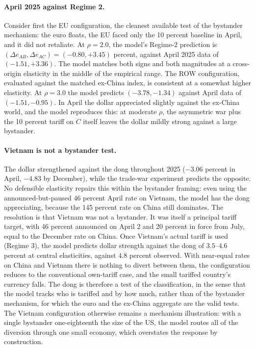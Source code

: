 \documentclass[11pt]{article}
\theoremstyle{plain}
\theoremstyle{remark}
\numberwithin{lemma}{section}
\numberwithin{proposition}{section}
\numberwithin{corollary}{section}
\newenvironment{revblock}{\par\begingroup\color{RevBlue}}{\endgroup\par}
\begin{document}
\begin{revblock}
\paragraph{April 2025 against Regime 2.} Consider first the EU configuration, the cleanest available test of the bystander mechanism: the euro floats, the EU faced only the 10 percent baseline in April, and it did not retaliate. At $\rho = 2.0$, the model's Regime-2 prediction is $(\Delta e_{AB}, \Delta e_{AC}) = (-0.80, +3.45)$ percent, against April 2025 data of $(-1.51, +3.36)$. The model matches both signs and both magnitudes at a cross-origin elasticity in the middle of the empirical range. The ROW configuration, evaluated against the matched ex-China index, is consistent at a somewhat higher elasticity. At $\rho = 3.0$ the model predicts $(-3.78, -1.34)$ against April data of $(-1.51, -0.95)$. In April the dollar appreciated slightly against the ex-China world, and the model reproduces this: at moderate $\rho$, the asymmetric war plus the 10 percent tariff on $C$ itself leaves the dollar mildly strong against a large bystander.

\paragraph{Vietnam is not a bystander test.} The dollar strengthened against the dong throughout 2025 ($-3.06$ percent in April, $-4.83$ by December), while the trade-war experiment predicts the opposite. No defensible elasticity repairs this within the bystander framing: even using the announced-but-paused 46 percent April rate on Vietnam, the model has the dong appreciating, because the 145 percent rate on China still dominates. The resolution is that Vietnam was not a bystander. It was itself a principal tariff target, with 46 percent announced on April 2 and 20 percent in force from July, equal to the December rate on China. Once Vietnam's actual tariff is used (Regime 3), the model predicts dollar strength against the dong of $3.5$--$4.6$ percent at central elasticities, against $4.8$ percent observed. With near-equal rates on China and Vietnam there is nothing to divert between them, the configuration reduces to the conventional own-tariff case, and the small tariffed country's currency falls. The dong is therefore a test of the classification, in the sense that the model tracks who is tariffed and by how much, rather than of the bystander mechanism, for which the euro and the ex-China aggregate are the valid tests. The Vietnam configuration otherwise remains a mechanism illustration: with a single bystander one-eighteenth the size of the US, the model routes all of the diversion through one small economy, which overstates the response by construction.


\end{revblock}
\end{document}
